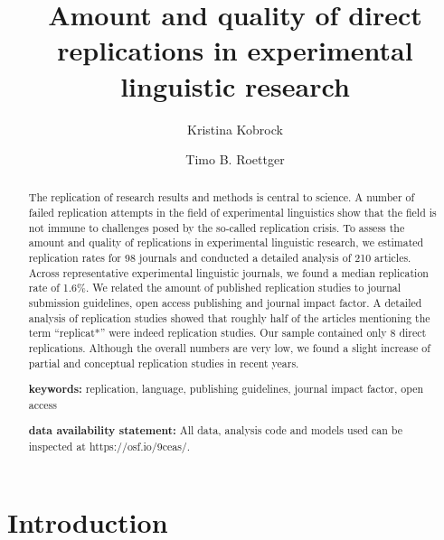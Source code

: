 \documentclass[]{elsarticle} %
\begin{document}
\begin{frontmatter}

  \title{Amount and quality of direct replications in experimental
linguistic research}
    \author[University of Osnabrück]{Kristina Kobrock}
    \author[Universitetet i Oslo]{Timo B. Roettger}
      \address[University of Osnabrück]{University of Osnabrück,
Institute of Cognitive Science, Wachsbleiche 27, 49090 Osnabrück,
Germany}
    \address[Universitetet i Oslo]{Universitetet i Oslo, Department of
Linguistics and Scandinavian Studies, Niels Henrik Abels vei 36, 0313
Oslo, Norway}
  
  \begin{abstract}
  The replication of research results and methods is central to science.
  A number of failed replication attempts in the field of experimental
  linguistics show that the field is not immune to challenges posed by
  the so-called replication crisis. To assess the amount and quality of
  replications in experimental linguistic research, we estimated
  replication rates for 98 journals and conducted a detailed analysis of
  210 articles. Across representative experimental linguistic journals,
  we found a median replication rate of 1.6\%. We related the amount of
  published replication studies to journal submission guidelines, open
  access publishing and journal impact factor. A detailed analysis of
  replication studies showed that roughly half of the articles
  mentioning the term ``replicat*'' were indeed replication studies. Our
  sample contained only 8 direct replications. Although the overall
  numbers are very low, we found a slight increase of partial and
  conceptual replication studies in recent years.

  \textbf{keywords:} replication, language, publishing guidelines,
  journal impact factor, open access

  \textbf{data availability statement:} All data, analysis code and
  models used can be inspected at https://osf.io/9ceas/.
  \end{abstract}
  
 \end{frontmatter}

\hypertarget{introduction}{%
\section{Introduction}\label{introduction}}
\end{document}
